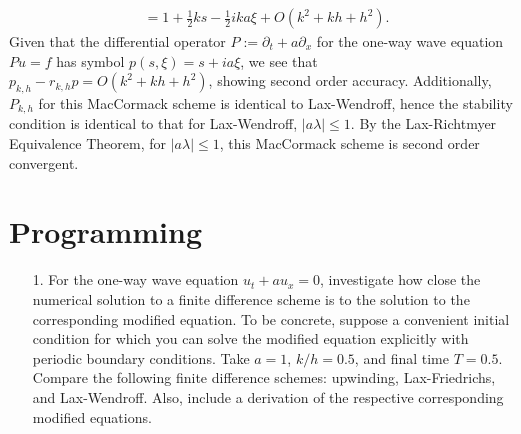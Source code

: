 \documentclass{article}
\providecommand{\abs}[1]{\left\lvert#1\right\rvert}
\begin{document}
\begin{itemize}
\begin{align*}
               & = 1 + \frac{1}{2} k s - \frac{1}{2} i k a \xi + O \left( k^2 + kh + h^2 \right).
\end{align*}
Given that the differential operator $P := \partial_t + a \partial_x$ for the one-way wave equation $P u = f$ has symbol $p(s,\xi) = s + i a \xi$, we see that $p_{k,h} - r_{k,h} p = O \left( k^2 + kh + h^2 \right)$, showing second order accuracy. Additionally, $P_{k,h}$ for this MacCormack scheme is identical to Lax-Wendroff, hence the stability condition is identical to that for Lax-Wendroff, $\abs{a\lambda} \leq 1$. By the Lax-Richtmyer Equivalence Theorem, for $\abs{a\lambda} \leq 1$, this MacCormack scheme is second order convergent.

\end{itemize}

\section{Programming}

\begin{itemize}

\item[1.] For the one-way wave equation $u_t + a u_x = 0$, investigate how close the numerical solution to a finite difference scheme is to the solution to the corresponding modified equation. To be concrete, suppose a convenient initial condition for which you can solve the modified equation explicitly with periodic boundary conditions. Take $a = 1$, $k/h = 0.5$, and final time $T = 0.5$. Compare the following finite difference schemes: upwinding, Lax-Friedrichs, and Lax-Wendroff. Also, include a derivation of the respective corresponding modified equations.

\end{itemize}
\end{document}
